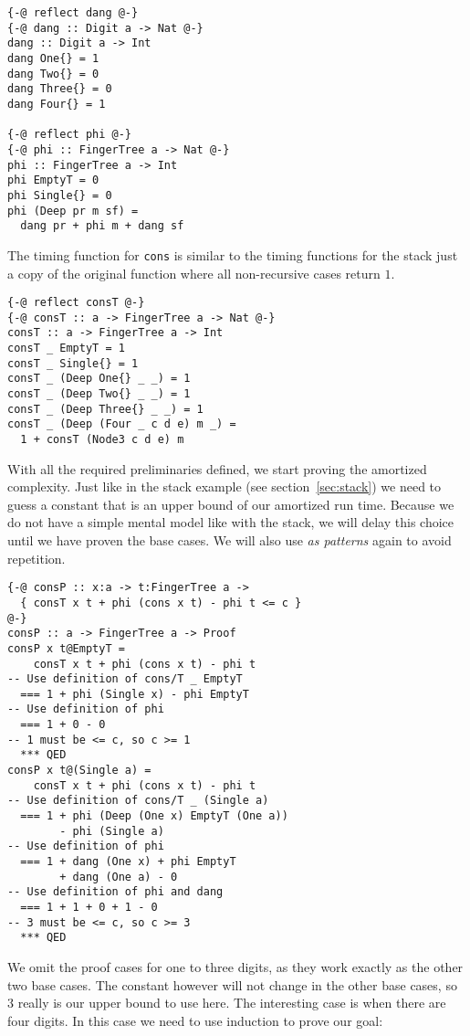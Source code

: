 \documentclass[sigplan,screen,review,anonymous]{acmart}
\begin{document}
\begin{lstlisting}
{-@ reflect dang @-}
{-@ dang :: Digit a -> Nat @-}
dang :: Digit a -> Int
dang One{} = 1
dang Two{} = 0
dang Three{} = 0
dang Four{} = 1

{-@ reflect phi @-}
{-@ phi :: FingerTree a -> Nat @-}
phi :: FingerTree a -> Int
phi EmptyT = 0
phi Single{} = 0
phi (Deep pr m sf) =
  dang pr + phi m + dang sf
\end{lstlisting}

The timing function for \texttt{cons} is similar to the timing functions for the stack just a copy of the original function where all non-recursive cases return $1$.

\begin{lstlisting}
{-@ reflect consT @-}
{-@ consT :: a -> FingerTree a -> Nat @-}
consT :: a -> FingerTree a -> Int
consT _ EmptyT = 1
consT _ Single{} = 1
consT _ (Deep One{} _ _) = 1
consT _ (Deep Two{} _ _) = 1
consT _ (Deep Three{} _ _) = 1
consT _ (Deep (Four _ c d e) m _) =
  1 + consT (Node3 c d e) m
\end{lstlisting}

With all the required preliminaries defined, we start proving the amortized complexity. Just like in the stack example (see section~\ref{sec:stack}) we need to guess a constant that is an upper bound of our amortized run time. Because we do not have a simple mental model like with the stack, we will delay this choice until we have proven the base cases. We will also use \textit{as patterns} again to avoid repetition.

\begin{lstlisting}
{-@ consP :: x:a -> t:FingerTree a ->
  { consT x t + phi (cons x t) - phi t <= c }
@-}
consP :: a -> FingerTree a -> Proof
consP x t@EmptyT =
    consT x t + phi (cons x t) - phi t
-- Use definition of cons/T _ EmptyT
  === 1 + phi (Single x) - phi EmptyT
-- Use definition of phi
  === 1 + 0 - 0
-- 1 must be <= c, so c >= 1
  *** QED
consP x t@(Single a) =
    consT x t + phi (cons x t) - phi t
-- Use definition of cons/T _ (Single a)
  === 1 + phi (Deep (One x) EmptyT (One a))
        - phi (Single a)
-- Use definition of phi
  === 1 + dang (One x) + phi EmptyT
        + dang (One a) - 0
-- Use definition of phi and dang
  === 1 + 1 + 0 + 1 - 0
-- 3 must be <= c, so c >= 3
  *** QED
\end{lstlisting}

We omit the proof cases for one to three digits, as they work exactly as the other two base cases. The constant however will not change in the other base cases, so $3$ really is our upper bound to use here. The interesting case is when there are four digits. In this case we need to use induction to prove our goal:
\end{document}
